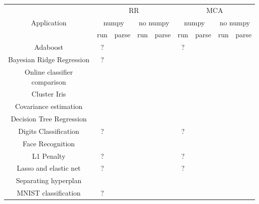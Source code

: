 \documentclass[11pt]{article}
\newcommand{\cross}[0]{\cellcolor{red!65}\ding{53}}
\newcommand{\valid}[0]{\cellcolor{green!75!black}\ding{51}}
\newcommand{\warn}[0]{\cellcolor{orange!75}?}
\begin{document}
\begin{table}[]
    \centering
    \begin{tabular}{|c|c|c|c|c||c|c|c|c|}
    \hline
    \multirow{3}{5em}{Application} & \multicolumn{4}{|c||}{RR} & \multicolumn{4}{|c|}{MCA} \\\cline{2-9}
                & \multicolumn{2}{|c|}{numpy} &  \multicolumn{2}{|c||}{no numpy} & \multicolumn{2}{|c|}{numpy} & \multicolumn{2}{|c|}{no numpy} \\\cline{2-9}
                & run & parse &  run & parse & run & parse & run & parse \\
    \hline
    Adaboost & \warn & \valid & \valid & \valid & \warn & \cross & \cross & \cross \\
    Bayesian Ridge Regression & \warn & \valid & \valid & \valid & \cross & \cross & \cross & \cross \\
    Online classifier comparison & \valid & \valid & \valid & \valid & \cross & \cross & \cross & \cross  \\
    Cluster Iris & \valid & \valid & \valid & \valid & \valid & \cross & \valid & \cross \\
    Covariance estimation & \valid & \cross & \valid & \cross & \cross & \cross & \valid & \cross \\
    Decision Tree Regression & \valid & \valid & \valid & \valid & \valid & \cross & \valid & \cross \\
    Digits Classification & \warn & \valid & \valid & \valid & \warn & \cross & \cross & \cross \\
    Face Recognition & \cross & \valid & \cross & \valid & \cross & \cross & \cross & \cross \\
    L1 Penalty & \warn & \valid & \valid & \valid & \warn & \cross & \valid & \valid \\
    Lasso and elastic net & \warn & \valid & \valid & \valid & \warn & \cross & \valid & \cross \\
    Separating hyperplan & \valid & \valid & \valid & \valid & \valid & \cross & \valid & \cross \\
    MNIST classification & \warn & \valid & \valid & \valid & \valid & \cross & \valid & \valid \\

\end{tabular}
\end{table}
\end{document}
